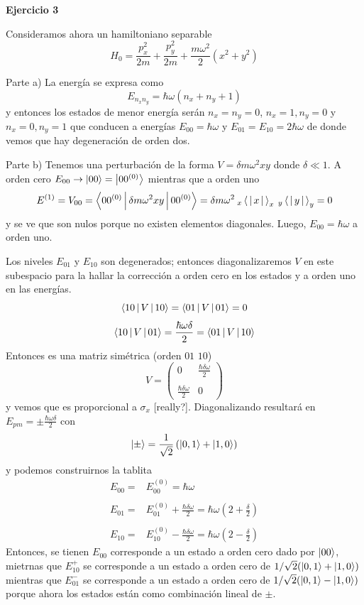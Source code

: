 \documentclass[10pt,oneside]{CBFT_book}
\begin{document}
\begin{ejemplo}{\bf Ejercicio 3}

Consideramos ahora un hamiltoniano separable
\[
	H_0 = \frac{p_x^2}{2m} + \frac{p_y^2}{2m} + \frac{ m \omega^2}{2}( x^2 + y^2 )
\]
 
Parte a)
La energía se expresa como
\[
	E_{n_x n_y} = \hbar \omega ( n_x + n_y + 1 )
\]
y entonces los estados de menor energía serán $n_x=n_y=0$, $n_x=1,n_y=0$ y $n_x=0,n_y=1$ que conducen
a energías $E_{00} = \hbar \omega$ y $E_{01} = E_{10} = 2 \hbar \omega $ de donde vemos que hay
degeneración de orden dos.

Parte b)
Tenemos una perturbación de la forma $ V = \delta m \omega^2 x y $ donde $\delta \ll 1$.
A orden cero $ E_{00} \to \Ket{0 0} = \Ket{0 0^{(0)}}$ mientras que a orden uno 
\[
	E^{(1)} = V_{00} = \Braket{0 0^{(0)}| \delta m \omega^2 x y|0 0^{(0)}} =
	 \delta m \omega^2 \: _x\Braket{|x|}_x \: _y\Braket{|y|}_y = 0
\]
y se ve que son nulos porque no existen elementos diagonales. Luego, $E_{00} = \hbar\omega$ a
orden uno.

Los niveles $E_{01}$ y $E_{10}$ son degenerados; entonces diagonalizaremos $V$ en este subespacio 
para la hallar la corrección a orden cero en los estados y a orden uno en las energías.
\[
	\Braket{10|V|10} = \Braket{01|V|01} = 0
\]
\[
	\Braket{10|V|01} = \frac{\hbar\omega\delta}{2} = \Braket{01|V|10}
\]
Entonces es una matriz simétrica (orden $01$ $10$)
\[
	V = \begin{pmatrix}
		0 & \frac{\hbar\delta\omega}{2} \\
		\\
		\frac{\hbar\delta\omega}{2} & 0
	    \end{pmatrix}
\]
y vemos que es proporcional a $\sigma_x$ [really?]. Diagonalizando resultará en 
$ E_{pm} = \pm \frac{\hbar\omega\delta}{2}$ con
\[
	\Ket{\pm} = \frac{1}{\sqrt{2}} \left( \Ket{0,1} + \Ket{1,0} \right)
\]
y podemos construirnos la tablita
\begin{eqnarray*}
	E_{00} = & E_{00}^{(0)} = \hbar \omega \\
	&\\
	E_{01} = & E_{01}^{(0)} + \displaystyle \frac{\hbar \delta \omega}{2} = 
	\hbar \omega \left( 2 + \frac{\delta}{2} \right) \\
	&\\
	E_{10} = & E_{10}^{(0)} - \displaystyle  \frac{\hbar \delta \omega}{2} = 
	\hbar \omega \left( 2 - \frac{\delta}{2} \right)
\end{eqnarray*}
Entonces, se tienen $E_{00}$ corresponde a un estado a orden cero dado por $\Ket{ 0 0 }$, mietrnas
que $E^+_{10}$ se corresponde a un estado a orden cero de $1/\sqrt{2}( \Ket{0,1} + \Ket{1,0})$
mientras que $E^-_{01}$ se corresponde a un estado a orden cero de $1/\sqrt{2}( \Ket{0,1} - \Ket{1,0})$
porque ahora los estados están como combinación lineal de $\pm$.


\end{ejemplo}
\end{document}
